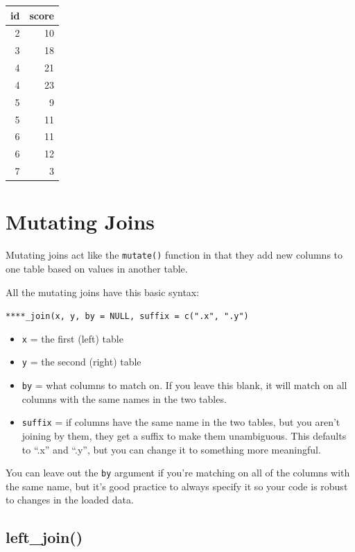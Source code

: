 \documentclass[
  oneside]{book}
\providecommand{\tightlist}{%
  \setlength{\itemsep}{0pt}\setlength{\parskip}{0pt}}
\begin{document}
\begin{tabular}{r|r}
\hline
id & score\\
\hline
2 & 10\\
\hline
3 & 18\\
\hline
4 & 21\\
\hline
4 & 23\\
\hline
5 & 9\\
\hline
5 & 11\\
\hline
6 & 11\\
\hline
6 & 12\\
\hline
7 & 3\\
\hline
\end{tabular}

\hypertarget{mutating-joins}{%
\section{Mutating Joins}\label{mutating-joins}}

Mutating joins act like the \texttt{mutate()} function in that they add new columns to one table based on values in another table.

All the mutating joins have this basic syntax:

\texttt{****\_join(x,\ y,\ by\ =\ NULL,\ suffix\ =\ c(".x",\ ".y")}

\begin{itemize}
\tightlist
\item
  \texttt{x} = the first (left) table
\item
  \texttt{y} = the second (right) table
\item
  \texttt{by} = what columns to match on. If you leave this blank, it will match on all columns with the same names in the two tables.
\item
  \texttt{suffix} = if columns have the same name in the two tables, but you aren't joining by them, they get a suffix to make them unambiguous. This defaults to ``.x'' and ``.y'', but you can change it to something more meaningful.
\end{itemize}

\begin{info}
You can leave out the \texttt{by} argument if you're matching on all of the columns with the same name, but it's good practice to always specify it so your code is robust to changes in the loaded data.

\end{info}

\hypertarget{left_join}{%
\subsection{left\_join()}\label{left_join}}
\end{document}
